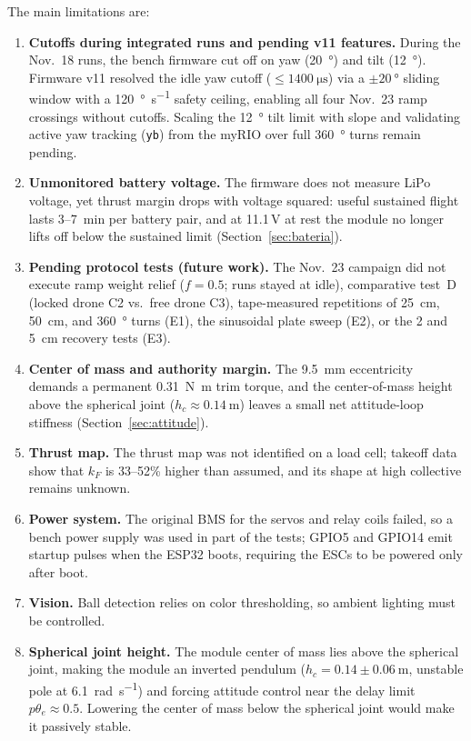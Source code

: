 The main limitations are:
\begin{enumerate}[label=(\roman*)]
  \item \textbf{Cutoffs during integrated runs and pending v11 features.} During the Nov.~18 runs, the bench firmware cut off on yaw (\SI{20}{\degree}) and tilt (\SI{12}{\degree}). Firmware v11 resolved the idle yaw cutoff ($\le\SI{1400}{\micro\second}$) via a $\pm\SI{20}{\degree}$ sliding window with a \SI{120}{\degree\per\second} safety ceiling, enabling all four Nov.~23 ramp crossings without cutoffs. Scaling the \SI{12}{\degree} tilt limit with slope and validating active yaw tracking (\texttt{yb}) from the myRIO over full \SI{360}{\degree} turns remain pending.
  \item \textbf{Unmonitored battery voltage.} The firmware does not measure LiPo voltage, yet thrust margin drops with voltage squared: useful sustained flight lasts 3--\SI{7}{\minute} per battery pair, and at 11.1\,V at rest the module no longer lifts off below the sustained limit (Section~\ref{sec:bateria}).
  \item \textbf{Pending protocol tests (future work).} The Nov.~23 campaign did not execute ramp weight relief ($f=0.5$; runs stayed at idle), comparative test~D (locked drone C2 vs.\ free drone C3), tape-measured repetitions of \SI{25}{\centi\metre}, \SI{50}{\centi\metre}, and \SI{360}{\degree} turns (E1), the sinusoidal plate sweep (E2), or the 2 and \SI{5}{\centi\metre} recovery tests (E3).
  \item \textbf{Center of mass and authority margin.} The \SI{9.5}{\milli\metre} eccentricity demands a permanent \SI{0.31}{\newton\metre} trim torque, and the center-of-mass height above the spherical joint ($h_c\approx\SI{0.14}{\metre}$) leaves a small net attitude-loop stiffness (Section~\ref{sec:attitude}).
  \item \textbf{Thrust map.} The thrust map was not identified on a load cell; takeoff data show that $k_F$ is 33--52\% higher than assumed, and its shape at high collective remains unknown.
  \item \textbf{Power system.} The original BMS for the servos and relay coils failed, so a bench power supply was used in part of the tests; GPIO5 and GPIO14 emit startup pulses when the ESP32 boots, requiring the ESCs to be powered only after boot.
  \item \textbf{Vision.} Ball detection relies on color thresholding, so ambient lighting must be controlled.
  \item \textbf{Spherical joint height.} The module center of mass lies above the spherical joint, making the module an inverted pendulum ($h_c=0.14\pm\SI{0.06}{\metre}$, unstable pole at \SI{6.1}{\radian\per\second}) and forcing attitude control near the delay limit $p\theta_e\approx0.5$. Lowering the center of mass below the spherical joint would make it passively stable.

\end{enumerate}
